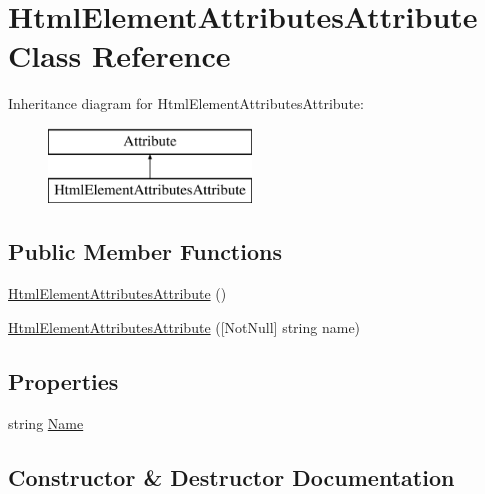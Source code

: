 \hypertarget{class_html_element_attributes_attribute}{}\section{Html\+Element\+Attributes\+Attribute Class Reference}
\label{class_html_element_attributes_attribute}
Inheritance diagram for Html\+Element\+Attributes\+Attribute\+:\begin{figure}[H]
\begin{center}
\leavevmode
\includegraphics[height=2.000000cm]{class_html_element_attributes_attribute}
\end{center}
\end{figure}
\subsection*{Public Member Functions}
\begin{DoxyCompactItemize}
\item 
\mbox{\hyperlink{class_html_element_attributes_attribute_adc220d1ae81f704213d407d354314658}{Html\+Element\+Attributes\+Attribute}} ()
\item 
\mbox{\hyperlink{class_html_element_attributes_attribute_a4d6a9dea9e671b8e33cc4e87e4a8c88e}{Html\+Element\+Attributes\+Attribute}} (\mbox{[}Not\+Null\mbox{]} string name)
\end{DoxyCompactItemize}
\subsection*{Properties}
\begin{DoxyCompactItemize}
\item 
string \mbox{\hyperlink{class_html_element_attributes_attribute_a6d108098ab54c1770cb01df2e1051fd7}{Name}}
\end{DoxyCompactItemize}


\subsection{Constructor \& Destructor Documentation}
\mbox{\label{class_html_element_attributes_attribute_adc220d1ae81f704213d407d354314658}} 

